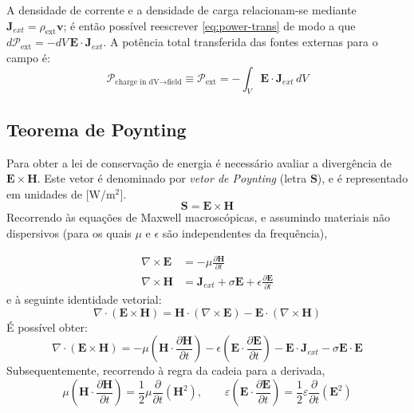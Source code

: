 A densidade de corrente e a densidade de carga relacionam-se mediante $\mathbf{J}_{ext} = \rho_{\text{ext}}\mathbf{v}$; é então possível reescrever \eqref{eq:power-trans} de modo a que $d\mathcal{P}_{\text{ext}} = -dV\, \mathbf{E}\cdot \mathbf{J}_{ext}$. A potência total transferida das fontes externas para o campo é:
\begin{equation}
    \mathcal{P}_{\text{charge in dV}\rightarrow\text{field}} \equiv \mathcal{P}_\text{ext}= -\int_V \mathbf{E} \cdot \mathbf{J}_{ext} \,dV
\end{equation}
\subsection{Teorema de Poynting}
Para obter a lei de conservação de energia é necessário avaliar a divergência de $\mathbf{E} \times \mathbf{H}$. Este vetor é denominado por \textit{vetor de Poynting} (letra $\mathbf{S}$), e é representado em unidades de $[$W/m$^2]$.
\begin{equation}
    \boxed{\mathbf{S} = \mathbf{E} \times \mathbf{H}}
\end{equation}
Recorrendo às equações de Maxwell macroscópicas, e assumindo materiais não dispersivos (para os quais $\mu$ e $\epsilon$ são independentes da frequência),%

\vspace{-1em}
\begin{align}
    \nabla \times \mathbf{E} &= -\mu\frac{\partial \mathbf{H}}{\partial t} \\[1pt]
    \nabla \times \mathbf{H} &= \mathbf{J}_{ext} + \sigma \mathbf{E} + \epsilon\frac{\partial \mathbf{E}}{\partial t}
\end{align}
e à seguinte identidade vetorial:
\begin{equation}
    \nabla \cdot (\mathbf{E} \times \mathbf{H}) = \mathbf{H} \cdot (\nabla \times \mathbf{E}) - \mathbf{E} \cdot (\nabla \times \mathbf{H})
\end{equation}
É possível obter:
\begin{equation}\label{eq:Poynting}
    \nabla \cdot (\mathbf{E} \times \mathbf{H}) = -\mu\left(\mathbf{H} \cdot \frac{\partial \mathbf{H}}{\partial t}\right) - \epsilon\left(\mathbf{E} \cdot \frac{\partial \mathbf{E}}{\partial t}\right) -\mathbf{E} \cdot \mathbf{J}_{ext} - \sigma \mathbf{E} \cdot \mathbf{E}
\end{equation}
Subsequentemente, recorrendo à regra da cadeia para a derivada,
\begin{equation}
    \mu \left( \mathbf{H} \cdot \frac{\partial \mathbf{H}}{\partial t} \right) = \frac{1}{2} \mu \frac{\partial}{\partial t}(\mathbf{H}^2), 
    \qquad
    \varepsilon \left( \mathbf{E} \cdot \frac{\partial \mathbf{E}}{\partial t} \right) = \frac{1}{2} \varepsilon \frac{\partial}{\partial t}(\mathbf{E}^2)
\end{equation}

